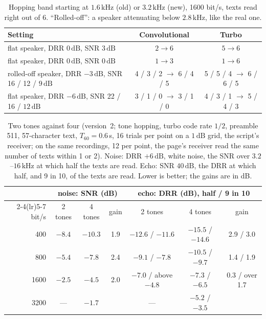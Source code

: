 \documentclass[11pt,a4paper]{article}
\newcommand{\kHz}{\,\mathrm{kHz}}
\newcommand{\dB}{\,\mathrm{dB}}
\theoremstyle{remark}
\begin{document}
\begin{table}[ht]
\centering
\caption{Hopping band starting at $1.6\kHz$ (old) or $3.2\kHz$ (new), 1600 bit/s, texts read right out of 6. ``Rolled-off'': a speaker attenuating below $2.8\kHz$, like the real one.}
\label{tab:band}
\small
\begin{tabular}{lcc}
\toprule
Setting & Convolutional & Turbo\\
\midrule
flat speaker, DRR $0\dB$, SNR $3\dB$ & $2 \to 6$ & $5 \to 6$\\
flat speaker, DRR $0\dB$, SNR $0\dB$ & $1 \to 3$ & $1 \to 6$\\
rolled-off speaker, DRR $-3\dB$, SNR 16 / 12 / $9\dB$ & 4 / 3 / 2 $\to$ 6 / 4 / 5 & 5 / 5 / 4 $\to$ 6 / 6 / 5\\
flat speaker, DRR $-6\dB$, SNR 22 / 16 / $12\dB$ & 3 / 1 / 0 $\to$ 3 / 1 / 0 & 4 / 3 / 1 $\to$ 5 / 4 / 3\\
\bottomrule
\end{tabular}
\end{table}

\begin{table}[ht]
\centering
\caption{Two tones against four (version~2; tone hopping, turbo code rate $1/2$, preamble 511, 57-character text, $T_{60} = 0.6$\,s, 16 trials per point on a $1\dB$ grid, the script's receiver; on the same recordings, 12 per point, the page's receiver read the same number of texts within 1 or 2). Noise: DRR $+6\dB$, white noise, the SNR over $3.2$--$16\kHz$ at which half the texts are read. Echo: SNR $40\dB$, the DRR at which half, and 9 in 10, of the texts are read. Lower is better; the gains are in dB.}
\label{tab:mfsk}
\small
\begin{tabular}{rcccccc}
\toprule
& \multicolumn{3}{c}{noise: SNR (dB)} & \multicolumn{3}{c}{echo: DRR (dB), half / 9 in 10}\\
\cmidrule(lr){2-4}\cmidrule(lr){5-7}
bit/s & 2 tones & 4 tones & gain & 2 tones & 4 tones & gain\\
\midrule
400 & $-8.4$ & $-10.3$ & 1.9 & $-12.6$ / $-11.6$ & $-15.5$ / $-14.6$ & 2.9 / 3.0\\
800 & $-5.4$ & $-7.8$ & 2.4 & $-9.1$ / $-7.8$ & $-10.5$ / $-9.7$ & 1.4 / 1.9\\
1600 & $-2.5$ & $-4.5$ & 2.0 & $-7.0$ / above $-4.8$ & $-7.3$ / $-6.5$ & 0.3 / over 1.7\\
3200 & --- & $-1.7$ & & --- & $-5.2$ / $-3.5$ & \\
\bottomrule
\end{tabular}
\end{table}
\end{document}
